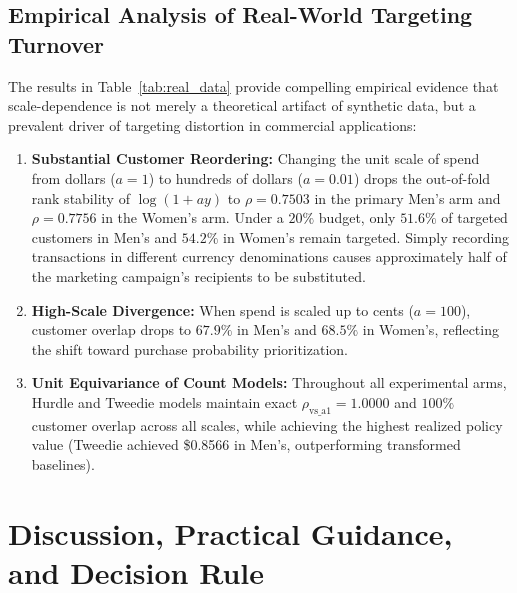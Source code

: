 \documentclass[conference]{IEEEtran}
\begin{document}
\subsection{Empirical Analysis of Real-World Targeting Turnover}
The results in Table~\ref{tab:real_data} provide compelling empirical evidence that scale-dependence is not merely a theoretical artifact of synthetic data, but a prevalent driver of targeting distortion in commercial applications:
\begin{enumerate}
    \item \textbf{Substantial Customer Reordering:} Changing the unit scale of spend from dollars ($a=1$) to hundreds of dollars ($a=0.01$) drops the out-of-fold rank stability of $\log(1+ay)$ to $\rho = 0.7503$ in the primary Men's arm and $\rho = 0.7756$ in the Women's arm. Under a $20\%$ budget, only $51.6\%$ of targeted customers in Men's and $54.2\%$ in Women's remain targeted. Simply recording transactions in different currency denominations causes approximately half of the marketing campaign's recipients to be substituted.
    \item \textbf{High-Scale Divergence:} When spend is scaled up to cents ($a=100$), customer overlap drops to $67.9\%$ in Men's and $68.5\%$ in Women's, reflecting the shift toward purchase probability prioritization.
    \item \textbf{Unit Equivariance of Count Models:} Throughout all experimental arms, Hurdle and Tweedie models maintain exact $\rho_{\text{vs\_a1}} = 1.0000$ and $100\%$ customer overlap across all scales, while achieving the highest realized policy value (Tweedie achieved \$0.8566 in Men's, outperforming transformed baselines).
\end{enumerate}

\section{Discussion, Practical Guidance, and Decision Rule}
\label{sec:discussion}
\end{document}
